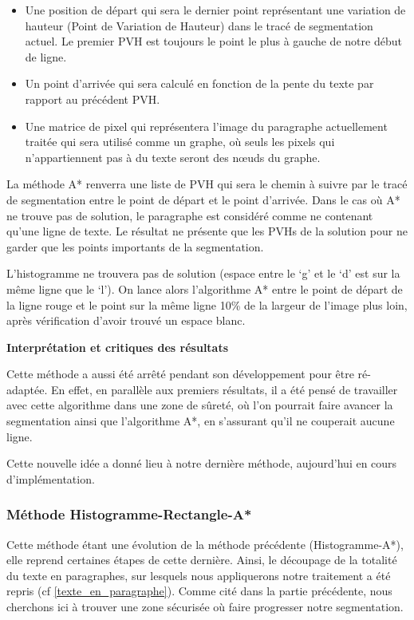 \documentclass[12pt,a4paper]{article}
\begin{document}
\begin{itemize}
    \item Une position de départ qui sera le dernier point représentant une variation de hauteur (Point de Variation de Hauteur) dans le tracé de segmentation actuel. Le premier PVH est toujours le point le plus à gauche de notre début de ligne.
    \item Un point d’arrivée qui sera calculé en fonction de la pente du texte par rapport au précédent PVH.
    \item Une matrice de pixel qui représentera l’image du paragraphe actuellement traitée qui sera utilisé comme un graphe, où seuls les pixels qui n’appartiennent pas à du texte seront des nœuds du graphe.
\end{itemize}



La méthode A* renverra une liste de PVH qui sera le chemin à suivre par le tracé de segmentation entre le point de départ et le point d’arrivée. Dans le cas où A* ne trouve pas de solution, le paragraphe est considéré comme ne contenant qu’une ligne de texte. \bigbreak
Le résultat ne présente que les PVHs de la solution pour ne garder que les points importants de la segmentation.


L’histogramme ne trouvera pas de solution (espace entre le ‘g’ et le ‘d’ est sur la même ligne que le ‘l’). On lance alors l’algorithme A* entre le point de départ de la ligne rouge et le point sur la même ligne 10\% de la largeur de l’image plus loin, après vérification d’avoir trouvé un espace blanc.

\bigbreak\textbf{Interprétation et critiques des résultats}\bigbreak

Cette méthode a aussi été arrêté pendant son développement pour être ré-adaptée. En effet, en parallèle aux premiers résultats,  il a été pensé de travailler avec cette algorithme dans une zone de sûreté, où l'on pourrait faire avancer la segmentation ainsi que l'algorithme A*, en s'assurant qu'il ne couperait aucune ligne.

Cette nouvelle idée a donné lieu à notre dernière méthode, aujourd'hui en cours d'implémentation.

\newpage
\subsubsection{Méthode Histogramme-Rectangle-A*}
Cette méthode étant une évolution de la méthode précédente (Histogramme-A*), elle reprend certaines étapes de cette dernière.\bigbreak
Ainsi, le découpage de la totalité du texte en paragraphes, sur lesquels nous appliquerons notre traitement a été repris (cf \ref{texte_en_paragraphe}).\bigbreak
Comme cité dans la partie précédente, nous cherchons ici à trouver une zone sécurisée où faire progresser notre segmentation.\bigbreak
\end{document}

